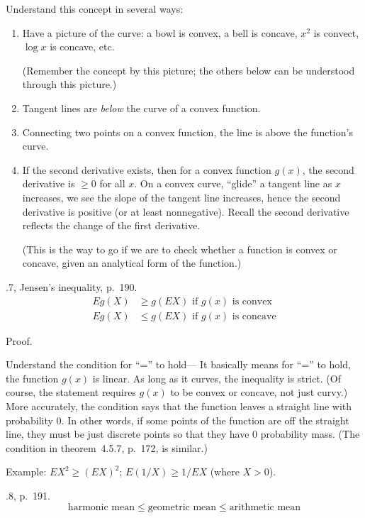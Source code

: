 \documentclass[12pt]{article}
\begin{document}
Understand this concept in several ways:
\begin{enumerate}
\item Have a picture of the curve: a bowl is convex, a bell is concave,
    $x^2$ is convect, $\log x$ is concave, etc.

    (Remember the concept by this picture; the others below can be
    understood through this picture.)
\item Tangent lines are \emph{below} the curve of a convex function.
\item Connecting two points on a convex function, the line is above the
    function's curve.
\item If the second derivative exists, then for a convex function
    $g(x)$, the second derivative is $\ge 0$ for all $x$.
    On a convex curve, ``glide'' a tangent line as $x$ increases,
    we see the slope of the tangent line increases,
    hence the second derivative is positive (or at least nonnegative).
    Recall the second derivative reflects the change of the first
    derivative.

    (This is the way to go if we are to check whether a function is
    convex or concave, given an analytical form of the function.)
\end{enumerate}

.7, Jensen's inequality, p.~190.
\[\begin{split}
Eg(X) &\ge g(EX) \text{ if $g(x)$ is convex}
\\
Eg(X) &\le g(EX) \text{ if $g(x)$ is concave}
\end{split}
\]

Proof.

Understand the condition for ``='' to hold---%
It basically means for ``='' to hold, the function $g(x)$ is linear.
As long as it curves, the inequality is strict.
(Of course, the statement requires $g(x)$ to be convex or concave, not
just curvy.)
More accurately, the condition says
that the function leaves a straight line with probability 0.
In other words, if some points of the function are off the straight
line, they must be just discrete points so that they have 0 probability
mass.
(The condition in theorem~4.5.7, p.~172, is similar.)

Example: $EX^2 \ge (EX)^2$; $E(1/X) \ge 1/EX$ (where $X > 0$).

.8, p.~191.
\[
\text{harmonic mean}
\le \text{geometric mean}
\le \text{arithmetic mean}
\]
\end{document}
